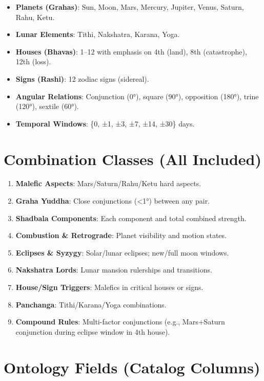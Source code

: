 \documentclass[
  11pt,
  a4paper,
  oneside,
  openany]{report}
\providecommand{\tightlist}{%
  \setlength{\itemsep}{0pt}\setlength{\parskip}{0pt}}\usepackage{longtable,booktabs,array}
\begin{document}
\begin{itemize}
\tightlist
\item
  \textbf{Planets (Grahas)}: Sun, Moon, Mars, Mercury, Jupiter, Venus,
  Saturn, Rahu, Ketu.
\item
  \textbf{Lunar Elements}: Tithi, Nakshatra, Karana, Yoga.
\item
  \textbf{Houses (Bhavas)}: 1--12 with emphasis on 4th (land), 8th
  (catastrophe), 12th (loss).
\item
  \textbf{Signs (Rashi)}: 12 zodiac signs (sidereal).
\item
  \textbf{Angular Relations}: Conjunction (0°), square (90°), opposition
  (180°), trine (120°), sextile (60°).
\item
  \textbf{Temporal Windows}: \{0, ±1, ±3, ±7, ±14, ±30\} days.
\end{itemize}

\section{Combination Classes (All
Included)}\label{combination-classes-all-included}

\begin{enumerate}
\def\labelenumi{\arabic{enumi}.}
\tightlist
\item
  \textbf{Malefic Aspects}: Mars/Saturn/Rahu/Ketu hard aspects.
\item
  \textbf{Graha Yuddha}: Close conjunctions (\textless1°) between any
  pair.
\item
  \textbf{Shadbala Components}: Each component and total combined
  strength.
\item
  \textbf{Combustion \& Retrograde}: Planet visibility and motion
  states.
\item
  \textbf{Eclipses \& Syzygy}: Solar/lunar eclipses; new/full moon
  windows.
\item
  \textbf{Nakshatra Lords}: Lunar mansion rulerships and transitions.
\item
  \textbf{House/Sign Triggers}: Malefics in critical houses or signs.
\item
  \textbf{Panchanga}: Tithi/Karana/Yoga combinations.
\item
  \textbf{Compound Rules}: Multi-factor conjunctions (e.g., Mars+Saturn
  conjunction during eclipse window in 4th house).
\end{enumerate}

\section{Ontology Fields (Catalog
Columns)}\label{ontology-fields-catalog-columns}
\end{document}
